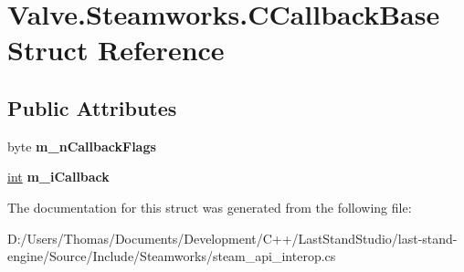 \hypertarget{structValve_1_1Steamworks_1_1CCallbackBase}{}\section{Valve.\+Steamworks.\+C\+Callback\+Base Struct Reference}
\label{structValve_1_1Steamworks_1_1CCallbackBase}
\subsection*{Public Attributes}
\begin{DoxyCompactItemize}
\item 
\hypertarget{structValve_1_1Steamworks_1_1CCallbackBase_a96bf2321a7c7d75c528d671eca3024c7}{}byte {\bfseries m\+\_\+n\+Callback\+Flags}\label{structValve_1_1Steamworks_1_1CCallbackBase_a96bf2321a7c7d75c528d671eca3024c7}

\item 
\hypertarget{structValve_1_1Steamworks_1_1CCallbackBase_a6a6836d718108094ed6ec0986f2f57ff}{}\hyperlink{SDL__thread_8h_a6a64f9be4433e4de6e2f2f548cf3c08e}{int} {\bfseries m\+\_\+i\+Callback}\label{structValve_1_1Steamworks_1_1CCallbackBase_a6a6836d718108094ed6ec0986f2f57ff}

\end{DoxyCompactItemize}


The documentation for this struct was generated from the following file\+:\begin{DoxyCompactItemize}
\item 
D\+:/\+Users/\+Thomas/\+Documents/\+Development/\+C++/\+Last\+Stand\+Studio/last-\/stand-\/engine/\+Source/\+Include/\+Steamworks/steam\+\_\+api\+\_\+interop.\+cs\end{DoxyCompactItemize}
